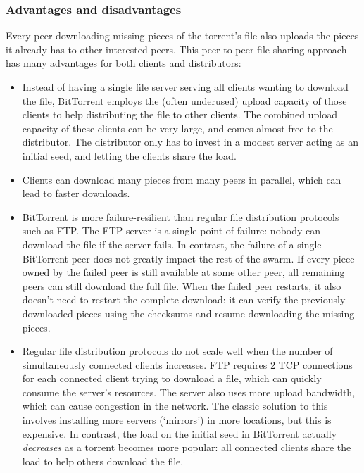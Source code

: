\subsubsection{Advantages and disadvantages}
Every peer downloading missing pieces of the torrent's file also uploads the pieces it already has to other interested peers. This peer-to-peer file sharing approach has many advantages for both clients and distributors:
\begin{itemize}
\item Instead of having a single file server serving all clients wanting to download the file, BitTorrent employs the (often underused) upload capacity of those clients to help distributing the file to other clients. The combined upload capacity of these clients can be very large, and comes almost free to the distributor. The distributor only has to invest in a modest server acting as an initial seed, and letting the clients share the load.
\item Clients can download many pieces from many peers in parallel, which can lead to faster downloads.
\item BitTorrent is more failure-resilient than regular file distribution protocols such as \gls{FTP}. The \gls{FTP} server is a single point of failure: nobody can download the file if the server fails. In contrast, the failure of a single BitTorrent peer does not greatly impact the rest of the swarm. If every piece owned by the failed peer is still available at some other peer, all remaining peers can still download the full file. When the failed peer restarts, it also doesn't need to restart the complete download: it can verify the previously downloaded pieces using the checksums and resume downloading the missing pieces.
\item Regular file distribution protocols do not scale well when the number of simultaneously connected clients increases. \gls{FTP} requires 2 \gls{TCP} connections for each connected client trying to download a file, which can quickly consume the server's resources. The server also uses more upload bandwidth, which can cause congestion in the network. The classic solution to this involves installing more servers (`mirrors') in more locations, but this is expensive. In contrast, the load on the initial seed in BitTorrent actually \emph{decreases} as a torrent becomes more popular: all connected clients share the load to help others download the file.
\end{itemize}

